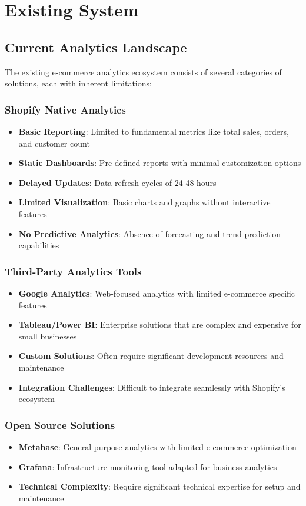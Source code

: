 \documentclass[12pt]{article}
\begin{document}
\section{Existing System}

\subsection{Current Analytics Landscape}
The existing e-commerce analytics ecosystem consists of several categories of solutions, each with inherent limitations:

\subsubsection{Shopify Native Analytics}
\begin{itemize}
    \item \textbf{Basic Reporting}: Limited to fundamental metrics like total sales, orders, and customer count
    \item \textbf{Static Dashboards}: Pre-defined reports with minimal customization options
    \item \textbf{Delayed Updates}: Data refresh cycles of 24-48 hours
    \item \textbf{Limited Visualization}: Basic charts and graphs without interactive features
    \item \textbf{No Predictive Analytics}: Absence of forecasting and trend prediction capabilities
\end{itemize}

\subsubsection{Third-Party Analytics Tools}
\begin{itemize}
    \item \textbf{Google Analytics}: Web-focused analytics with limited e-commerce specific features
    \item \textbf{Tableau/Power BI}: Enterprise solutions that are complex and expensive for small businesses
    \item \textbf{Custom Solutions}: Often require significant development resources and maintenance
    \item \textbf{Integration Challenges}: Difficult to integrate seamlessly with Shopify's ecosystem
\end{itemize}

\subsubsection{Open Source Solutions}
\begin{itemize}
    \item \textbf{Metabase}: General-purpose analytics with limited e-commerce optimization
    \item \textbf{Grafana}: Infrastructure monitoring tool adapted for business analytics
    \item \textbf{Technical Complexity}: Require significant technical expertise for setup and maintenance
\end{itemize}
\end{document}
